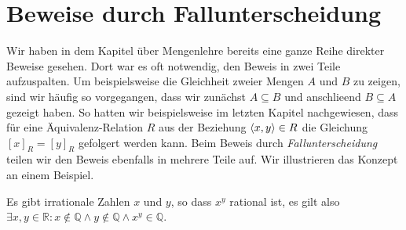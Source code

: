 \section{Beweise durch Fallunterscheidung}
Wir haben in dem Kapitel \"{u}ber Mengenlehre bereits eine ganze Reihe direkter Beweise gesehen.
Dort war es oft notwendig, den Beweis in zwei Teile aufzuspalten.
Um beispielsweise die Gleichheit zweier Mengen $A$ und $B$ zu zeigen, sind wir 
h\"{a}ufig so vorgegangen, dass wir zun\"{a}chst 
$A \subseteq B$ und anschlie\3end $B \subseteq A$ gezeigt haben.  So hatten wir beispielsweise  im
letzten Kapitel nachgewiesen, dass f\"{u}r eine \"{A}quivalenz-Relation $R$ aus der Beziehung $\pair(x,y) \in R$ die
Gleichung $[x]_R = [y]_R$ gefolgert werden kann.  Beim Beweis durch \emph{Fallunterscheidung} teilen
wir den Beweis ebenfalls in mehrere Teile auf.  Wir illustrieren das Konzept an einem Beispiel.

\begin{Satz}
  Es gibt irrationale Zahlen $x$ und $y$, so dass $x^y$ rational ist, es gilt also
  \\[0.2cm]
  \hspace*{1.3cm}
  $\exists x, y \in \mathbb{R}: x \not\in \mathbb{Q} \wedge y \not\in \mathbb{Q} \wedge x^y \in \mathbb{Q}$.
\end{Satz}

